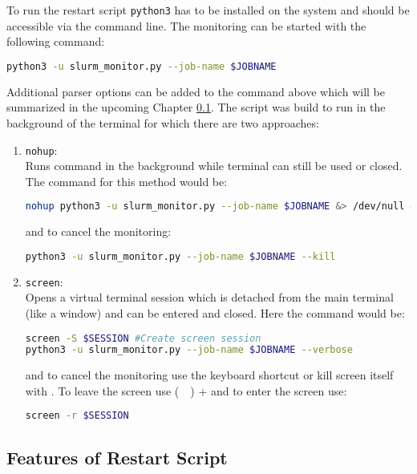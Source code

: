 To run the restart script \texttt{python3} has to be installed on the system and should be accessible via the command line. The monitoring can be started with the following command:
\begin{lstlisting}[language=Bash]
python3 -u slurm_monitor.py --job-name $JOBNAME
\end{lstlisting}
Additional parser options can be added to the command above which will be summarized in the upcoming Chapter \ref{sub:codeFeatures}. The script was build to run in the background of the terminal for which there are two approaches:
\begin{enumerate}
    \item \texttt{nohup}:\\
    Runs command in the background while terminal can still be used or closed. \cite{nohup} The command for this method would be:
\begin{lstlisting}[language=Bash]
nohup python3 -u slurm_monitor.py --job-name $JOBNAME &> /dev/null &
\end{lstlisting}
and to cancel the monitoring:
\begin{lstlisting}[language=Bash]
python3 -u slurm_monitor.py --job-name $JOBNAME --kill
\end{lstlisting}
    \item \texttt{screen}:\\
    Opens a virtual terminal session which is detached from the main terminal (like a window) and can be entered and closed. \cite{screen} Here the command would be:
\begin{lstlisting}[language=Bash]
screen -S $SESSION #Create screen session
python3 -u slurm_monitor.py --job-name $JOBNAME --verbose
\end{lstlisting}
and to cancel the monitoring use the keyboard shortcut  or kill screen itself with . To leave the screen use (~~) +  and to enter the screen use:
\begin{lstlisting}[language=Bash]
screen -r $SESSION
\end{lstlisting}
\end{enumerate}

\newpage
\subsection{Features of Restart Script}
\label{sub:codeFeatures}

